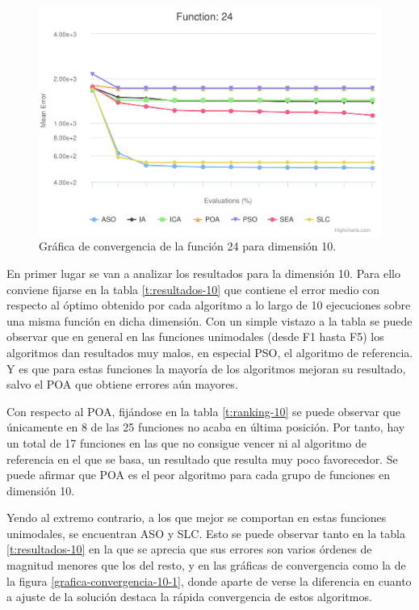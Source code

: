 \begin{figure}
	\centering
	\includegraphics[scale=0.6]{imagenes/grafica-convergencia-10-24.pdf}
	\caption{Gráfica de convergencia de la función 24 para dimensión 10.}
	\label{grafica-convergencia-10-24}
\end{figure}

En primer lugar se van a analizar los resultados para la dimensión 10. Para ello conviene fijarse en la tabla \ref{t:resultados-10} que contiene el error medio con respecto al óptimo obtenido por cada algoritmo a lo largo de 10 ejecuciones sobre una misma función en dicha dimensión. Con un simple vistazo a la tabla se puede observar que en general en las funciones unimodales (desde F1 hasta F5) los algoritmos dan resultados muy malos, en especial PSO, el algoritmo de referencia. Y es que para estas funciones la mayoría de los algoritmos mejoran su resultado, salvo el POA que obtiene errores aún mayores.

Con respecto al POA, fijándose en la tabla \ref{t:ranking-10} se puede observar que únicamente en 8 de las 25 funciones no acaba en última posición. Por tanto, hay un total de 17 funciones en las que no consigue vencer ni al algoritmo de referencia en el que se basa, un resultado que resulta muy poco favorecedor. Se puede afirmar que POA es el peor algoritmo para cada grupo de funciones en dimensión 10.

Yendo al extremo contrario, a los que mejor se comportan en estas funciones unimodales, se encuentran ASO y SLC. Esto se puede observar tanto en la tabla \ref{t:resultados-10} en la que se aprecia que sus errores son varios órdenes de magnitud menores que los del resto, y en las gráficas de convergencia como la de la figura \ref{grafica-convergencia-10-1}, donde aparte de verse la diferencia en cuanto a ajuste de la solución destaca la rápida convergencia de estos algoritmos.


